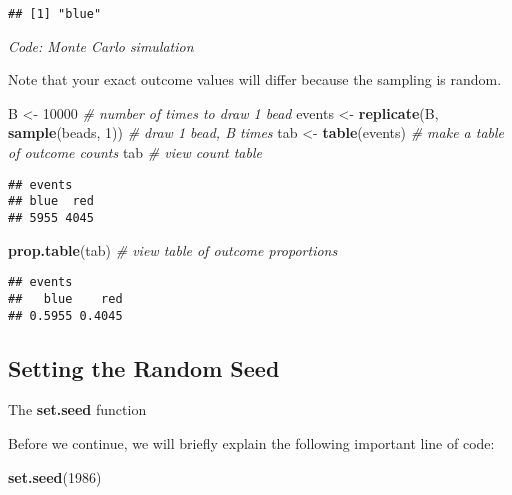 \documentclass[
]{article}
\newenvironment{Shaded}{\begin{snugshade}}{\end{snugshade}}
\newcommand{\CommentTok}[1]{\textcolor[rgb]{0.56,0.35,0.01}{\textit{#1}}}
\newcommand{\DecValTok}[1]{\textcolor[rgb]{0.00,0.00,0.81}{#1}}
\newcommand{\KeywordTok}[1]{\textcolor[rgb]{0.13,0.29,0.53}{\textbf{#1}}}
\newcommand{\NormalTok}[1]{#1}
\newcommand{\StringTok}[1]{\textcolor[rgb]{0.31,0.60,0.02}{#1}}
\begin{document}
\begin{verbatim}
## [1] "blue"
\end{verbatim}

\emph{Code: Monte Carlo simulation}

Note that your exact outcome values will differ because the sampling is
random.

\begin{Shaded}
\begin{Highlighting}[]
\NormalTok{B \textless{}{-}}\StringTok{ }\DecValTok{10000}    \CommentTok{\# number of times to draw 1 bead}
\NormalTok{events \textless{}{-}}\StringTok{ }\KeywordTok{replicate}\NormalTok{(B, }\KeywordTok{sample}\NormalTok{(beads, }\DecValTok{1}\NormalTok{))    }\CommentTok{\# draw 1 bead, B times}
\NormalTok{tab \textless{}{-}}\StringTok{ }\KeywordTok{table}\NormalTok{(events)    }\CommentTok{\# make a table of outcome counts}
\NormalTok{tab    }\CommentTok{\# view count table}
\end{Highlighting}
\end{Shaded}

\begin{verbatim}
## events
## blue  red 
## 5955 4045
\end{verbatim}

\begin{Shaded}
\begin{Highlighting}[]
\KeywordTok{prop.table}\NormalTok{(tab)    }\CommentTok{\# view table of outcome proportions}
\end{Highlighting}
\end{Shaded}

\begin{verbatim}
## events
##   blue    red 
## 0.5955 0.4045
\end{verbatim}

\hypertarget{setting-the-random-seed}{%
\subsection{Setting the Random Seed}\label{setting-the-random-seed}}

The \textbf{set.seed} function

Before we continue, we will briefly explain the following important line
of code:

\begin{Shaded}
\begin{Highlighting}[]
\KeywordTok{set.seed}\NormalTok{(}\DecValTok{1986}\NormalTok{)}
\end{Highlighting}
\end{Shaded}
\end{document}
